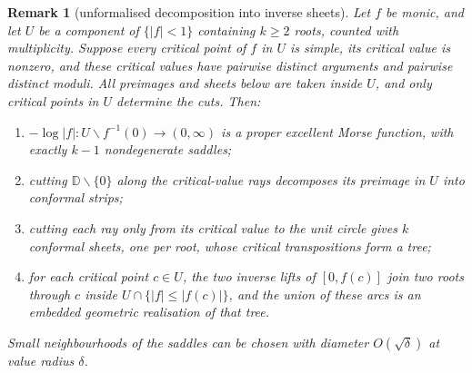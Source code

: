 \documentclass[11pt]{article}
\newtheorem{remark}[theorem]{Remark}
\begin{document}
\hypertarget{inverse-sheet-component}{}
\begin{remark}[unformalised decomposition into inverse sheets]
\label{res:attachment-aware-reeb}
Let $f$ be monic, and let $U$ be a component of $\{|f|<1\}$ containing
$k\ge2$ roots, counted with multiplicity. Suppose every critical point of
$f$ in $U$ is simple, its critical value is nonzero, and these critical
values have pairwise distinct arguments and pairwise distinct moduli.
All preimages and sheets below are taken inside $U$, and only critical
points in $U$ determine the cuts. Then:
\begin{enumerate}
\item $-\log|f|:U\mathbin{\backslash}f^{-1}(0)\to(0,\infty)$ is a proper excellent
Morse function, with exactly $k-1$ nondegenerate saddles;
\item cutting $\mathbb D\smallsetminus\{0\}$ along the critical-value rays
decomposes its preimage in $U$ into conformal strips;
\item cutting each ray only from its critical value to the unit circle gives
$k$ conformal sheets, one per root, whose critical transpositions form a tree;
\item for each critical point $c\in U$, the two inverse lifts of
$[0,f(c)]$ join two roots through $c$ inside
$U\cap\{|f|\le|f(c)|\}$, and the union of these arcs is an embedded
geometric realisation of that tree.
\end{enumerate}
Small neighbourhoods of the saddles can be chosen with diameter
$O(\sqrt\delta)$ at value radius $\delta$.
\end{remark}
\end{document}
